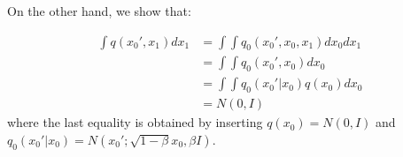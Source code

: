 On the other hand, we show that:
\iffalse
\begin{align}
    \int q(x_0', x_1) dx_1 &= \int \int q_1(x_0' | x_0, x_1) q_0(x_0|x_1) q(x_1) dx_0 dx_1 \\
    &= \int \int q(x_0' | x_0, x_1) q(x_0|x_1) q(x_1) dx_1 dx_0 \\
    &= \int \int q(x_0' | x_0) q(x_0|x_1) q(x_1) dx_1 dx_0 \\
    & = \int q(x_0'|x_0) \int q(x_0|x_1) q(x_1) dx_1 dx_0 \\
    & = \int q(x_0'|x_0) \sum_{x_1} q(x_0, x_1) dx_0 \\
    & = \int q(x_0'|x_0) \frac{1}{M} dx_0 \\
    & = \frac{1}{M} \sum_{x_0} q(x_0' | x_0) \\
    & = \frac{1}{M} \sum_{x_0} N(x_0'; \sqrt{1 - \beta} x_0, \beta)
\end{align}
\fi
\begin{align}
    \int q(x_0', x_1) dx_1 &= \int \int q_0(x_0', x_0, x_1) dx_0 dx_1 \\
    &= \int \int q_0(x_0', x_0) dx_0\\
    &= \int \int  q_0(x_0'|x_0) q(x_0) dx_0 \\
    & = N(0, I)
\end{align}
where the last equality is obtained by inserting $q(x_0) = N(0, I)$ and $q_0(x_0'|x_0) = N(x_0'; \sqrt{1 - \beta}x_0, \beta I)$.

\iffalse
When $M \rightarrow \infty$, it becomes a convolution of two Gaussian $N(0, (1 - \beta) I)$ and $N(0, \beta I)$.
%
By convolution of Gaussian, we can observe that:
\begin{align}
    \int q(x_0', x_1) dx_1 & = N(0, (1 - \beta)I + \beta I) \\
    & = N(0, I)\\
\end{align}
\fi